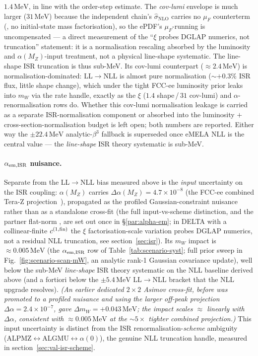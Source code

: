 \documentclass[11pt,a4paper]{article}
\newcommand{\code}[1]{\texttt{\detokenize{#1}}}
\newcommand{\mW}{m_W}
\newcommand{\MeV}{\ensuremath{\,\mathrm{MeV}}}
\begin{document}
$1.4\MeV$, in line with the order-step estimate. The \emph{cov-lumi}
envelope is much larger ($31\MeV$) because the independent chain's
$\hat\sigma_\text{NLO}$ carries no $\mu_F$ counterterm
(\code{pdf_set=none}, no initial-state mass factorisation), so the
ePDF's $\mu_F$-running is uncompensated --- a direct measurement of the
``$\xi$ probes DGLAP numerics, not truncation'' statement: it is a
normalisation rescaling absorbed by the luminosity and
$\alpha(M_Z)$-input treatment, not a physical line-shape systematic.
The line-shape ISR truncation is thus sub-MeV. Its cov-lumi counterpart
($\approx2.4\MeV$) is normalisation-dominated: LL$\to$NLL is almost pure
normalisation ($\sim+0.3\%$ ISR flux, little shape change), which under the
tight FCC-ee luminosity prior leaks into $\mW$ via the rate handle, exactly
as the $\xi$ ($1.4$ shape\,/\,$31$ cov-lumi) and $\alpha$-renormalisation
rows do. Whether this cov-lumi normalisation leakage is carried as a
separate ISR-normalisation component or absorbed into the luminosity $+$
cross-section-normalisation budget is left open; both numbers are reported.
Either way the $\pm22.4\MeV$ analytic-$\beta^3$ fallback is superseded once
eMELA NLL is the central value --- the \emph{line-shape} ISR theory
systematic is sub-MeV.

\paragraph{$\alpha_{\rm em,ISR}$ nuisance.}
Separate from the LL$\to$NLL bias measured above is the \emph{input}
uncertainty on the ISR coupling: $\alpha(M_Z)$ carries
$\Delta\alpha(M_Z)=4.7\times 10^{-8}$ (the FCC-ee combined Tera-Z
projection~\cite{RiembauTeraZ}), propagated as the profiled
Gaussian-constraint nuisance \code{aem_isr} rather than as a standalone
cross-fit (the full input-vs-scheme distinction, and the partner flat-norm
\code{aemEW}, are set out once in \S\ref{par:alpha-em}; in DELTA with a
collinear-finite $c^{(1,\rm fin)}$ the $\xi$ factorisation-scale variation
probes DGLAP numerics, not a residual NLL truncation, see
section~\ref{sec:isr}). Its $\mW$ impact is $\approx0.005\MeV$ (the
$\alpha_{\rm em,ISR}$ row of Table~\ref{tab:scenario-syst}; full prior sweep
in Fig.~\ref{fig:scenario-scan-mW}, an analytic rank-1 Gaussian covariance
update), well below the sub-MeV \emph{line-shape} ISR theory systematic
on the NLL baseline derived above (and a fortiori below the $\pm 5.4\MeV$
LL$\to$NLL bracket that the NLL upgrade resolves). \emph{(An earlier dedicated $2\times 2$ Asimov cross-fit,
before \code{aem_isr} was promoted to a profiled nuisance and using the
larger off-peak projection $\Delta\alpha=2.4\times10^{-7}$, gave
$\Delta\mW=+0.043\MeV$; the impact scales $\approx$ linearly with
$\Delta\alpha$, consistent with $\approx0.005\MeV$ at the $\sim\!5\times$
tighter combined projection.)} This input uncertainty is distinct from the ISR
renormalisation-\emph{scheme} ambiguity
(ALPMZ$\leftrightarrow$ALGMU$\leftrightarrow\alpha(0)$), the genuine NLL
truncation handle, measured in section~\ref{sec:val-isr-scheme}.
\end{document}
